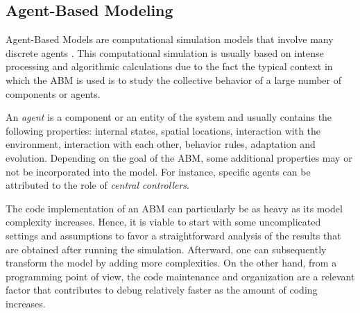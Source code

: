 \subsection{Agent-Based Modeling}
Agent-Based Models are computational simulation models that involve many discrete agents \cite{ago2019abm}. This computational simulation is usually based on intense processing and algorithmic calculations due to the fact the typical context in which the ABM is used is to study the collective behavior of a large number of components or agents.

An \emph{agent} is a component or an entity of the system and usually contains the following properties: internal states, spatial locations, interaction with the environment, interaction with each other, behavior rules, adaptation and evolution. Depending on the goal of the ABM, some additional properties may or not be incorporated into the model. For instance, specific agents can be attributed to the role of \emph{central controllers}.

The code implementation of an ABM can particularly be as heavy as its model complexity increases. Hence, it is viable to start with some uncomplicated settings and assumptions to favor a straightforward analysis of the results that are obtained after running the simulation. Afterward, one can subsequently transform the model by adding more complexities. On the other hand, from a programming point of view, the code maintenance and organization are a relevant factor that contributes to debug relatively faster as the amount of coding increases.

